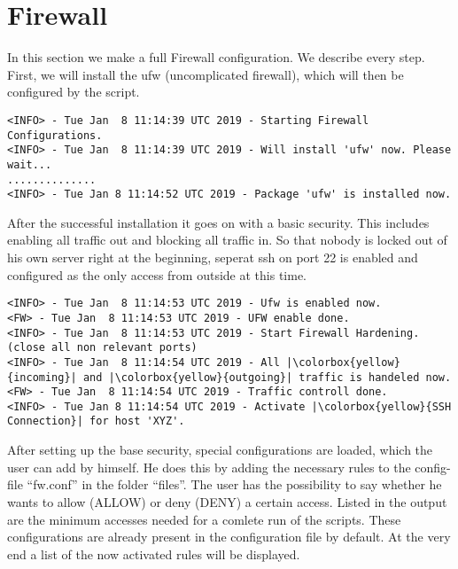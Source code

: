 \section{Firewall}
In this section we make a full Firewall configuration. We describe every step. \newline First, we will install the \gls{ufw} (uncomplicated firewall), which will then be configured by the script.
\begin{lstlisting}
<INFO> - Tue Jan  8 11:14:39 UTC 2019 - Starting Firewall Configurations.
<INFO> - Tue Jan  8 11:14:39 UTC 2019 - Will install 'ufw' now. Please wait...
..............
<INFO> - Tue Jan 8 11:14:52 UTC 2019 - Package 'ufw' is installed now.
\end{lstlisting}

After the successful installation it goes on with a basic security. This includes enabling all traffic out and blocking all traffic in.
So that nobody is locked out of his own server right at the beginning, seperat ssh on port 22 is enabled and configured as the only access from outside at this time.

\begin{lstlisting}[escapeinside=||]
<INFO> - Tue Jan  8 11:14:53 UTC 2019 - Ufw is enabled now.
<FW> - Tue Jan  8 11:14:53 UTC 2019 - UFW enable done.
<INFO> - Tue Jan  8 11:14:53 UTC 2019 - Start Firewall Hardening. (close all non relevant ports)
<INFO> - Tue Jan  8 11:14:54 UTC 2019 - All |\colorbox{yellow}{incoming}| and |\colorbox{yellow}{outgoing}| traffic is handeled now.
<FW> - Tue Jan  8 11:14:54 UTC 2019 - Traffic controll done.
<INFO> - Tue Jan 8 11:14:54 UTC 2019 - Activate |\colorbox{yellow}{SSH Connection}| for host 'XYZ'.
\end{lstlisting}

After setting up the base security, special configurations are loaded, which the user can add by himself. He does this by adding the necessary rules to the config-file ``fw.conf'' in the folder ``files''. The user has the possibility to say whether he wants to allow (ALLOW) or deny (DENY) a certain access.
Listed in the output are the minimum accesses needed for a comlete run of the scripts. These configurations are already present in the configuration file by default.
At the very end a list of the now activated rules will be displayed.

